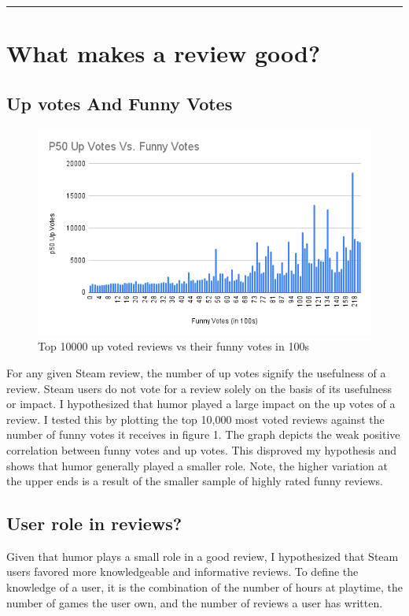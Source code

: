 {\color{gray}\hrule}
\section{What makes a review good?}

\subsection{Up votes And Funny Votes}

\begin{figure}[H]
    \centering
    \includegraphics[width=0.8\linewidth]{visuals/P50 Up Votes Vs. Funny Votes (2)}
    \caption{Top 10000 up voted reviews vs their funny votes in 100s}
    \label{fig:p50 Up Votes Vs. Funny Votes(100s)}
\end{figure}

For any given Steam review, the number of up votes signify the usefulness of a review. Steam users do not vote for a review solely on the basis of its usefulness or impact. I hypothesized that humor played a large impact on the up votes of a review.  I tested this by plotting the top 10,000 most voted reviews against the number of funny votes it receives in figure 1. The graph depicts the weak positive correlation between funny votes and up votes. This disproved my hypothesis and shows that humor generally played a smaller role. Note, the higher variation at the upper ends is a result of the smaller sample of highly rated funny reviews.

\subsection{User role in reviews?}
Given that humor plays a small role in a good review, I hypothesized that Steam users favored more knowledgeable and informative reviews. To define the knowledge of a user, it is the combination of the number of hours at playtime, the number of games the user own, and the number of reviews a user has written. 

